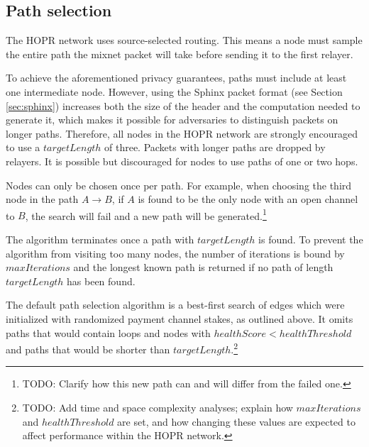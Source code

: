 \subsection{Path selection}
\label{sec:path-selection:graph-traversal}

The HOPR network uses source-selected routing. This means a node must sample the entire path the mixnet packet will take before sending it to the first relayer.

To achieve the aforementioned privacy guarantees, paths must include at least one intermediate node. However, using the Sphinx packet format (see Section \ref{sec:sphinx}) increases both the size of the header and the computation needed to generate it, which makes it possible for adversaries to distinguish packets on longer paths. Therefore, all nodes in the HOPR network are strongly encouraged to use a $targetLength$ of three. Packets with longer paths are dropped by relayers. It is possible but discouraged for nodes to use paths of one or two hops.

Nodes can only be chosen once per path. For example, when choosing the third node in the path $A\rightarrow B$, if $A$ is found to be the only node with an open channel to $B$, the search will fail and a new path will be generated.\footnote{TODO: Clarify how this new path can and will differ from the failed one.}

The algorithm terminates once a path with $targetLength$ is found. To prevent the algorithm from visiting too many nodes, the number of iterations is bound by $maxIterations$ and the longest known path is returned if no path of length $targetLength$ has been found.

The default path selection algorithm is a best-first search of edges which were initialized with randomized payment channel stakes, as outlined above. It omits paths that would contain loops and nodes with $healthScore < healthThreshold$ and paths that would be shorter than $targetLength$.\footnote{TODO: Add time and space complexity analyses; explain how $maxIterations$ and $healthThreshold$ are set, and how changing these values are expected to affect performance within the HOPR network.} 

